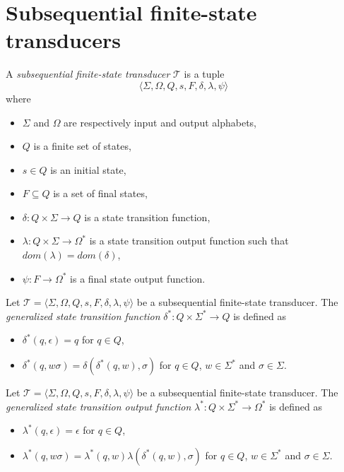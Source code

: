 \section{Subsequential finite-state transducers}

\begin{definition}
  A \emph{subsequential finite-state transducer} $\mathcal{T}$ is a tuple
  \begin{equation*}
    \langle \Sigma, \Omega, Q, s, F, \delta, \lambda, \psi \rangle
  \end{equation*}
  where
  \begin{itemize}
    \item $\Sigma$ and $\Omega$ are respectively input and output alphabets,
    \item $Q$ is a finite set of states,
    \item $s \in Q$ is an initial state,
    \item $F \subseteq Q$ is a set of final states,
    \item $\delta : Q \times \Sigma \rightarrow Q$ is a state transition function,
    \item $\lambda : Q \times \Sigma \rightarrow \Omega^*$ is a state transition
	    output function such that $dom(\lambda) = dom(\delta)$,
    \item $\psi : F \rightarrow \Omega^*$ is a final state output function.
  \end{itemize}
\end{definition}

\begin{definition}
  Let $\mathcal{T} = \langle \Sigma, \Omega, Q, s, F, \delta, \lambda, \psi \rangle$
  be a subsequential finite-state transducer. The \emph{generalized state transition
  function} $\delta^* : Q \times \Sigma^* \rightarrow Q$ is defined as
  \begin{itemize}
    \item $\delta^*(q, \epsilon) = q$ for $q \in Q$,
    \item $\delta^*(q, w\sigma) = \delta(\delta^*(q, w), \sigma)$ for $q \in Q$, $w
	    \in \Sigma^*$ and $\sigma \in \Sigma$.
  \end{itemize}
\end{definition}

\begin{definition}
  Let $\mathcal{T} = \langle \Sigma, \Omega, Q, s, F, \delta, \lambda, \psi \rangle$
  be a subsequential finite-state transducer. The \emph{generalized state transition
  output function} $\lambda^* : Q \times \Sigma^* \rightarrow \Omega^*$ is defined as
  \begin{itemize}
    \item $\lambda^*(q, \epsilon) = \epsilon$ for $q \in Q$,
    \item $\lambda^*(q, w\sigma) = \lambda^*(q, w) \lambda(\delta^*(q, w), \sigma)$
	    for $q \in Q$, $w \in \Sigma^*$ and $\sigma \in \Sigma$.
  \end{itemize}
\end{definition}

